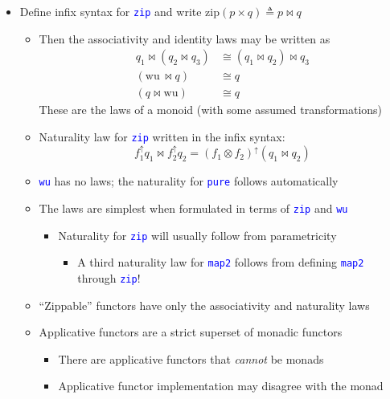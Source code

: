 \begin{itemize}
\item Define infix syntax for \texttt{\textcolor{blue}{\footnotesize{}zip}}
and write $\text{zip}\left(p\times q\right)\triangleq p\bowtie q$
\begin{itemize}
\item Then the associativity and identity laws may be written as{\footnotesize{}
\begin{align*}
q_{1}\bowtie\left(q_{2}\bowtie q_{3}\right) & \cong\left(q_{1}\bowtie q_{2}\right)\bowtie q_{3}\\
\left(\text{wu}\,\bowtie q\right) & \cong q\\
\left(q\bowtie\text{wu}\right) & \cong q
\end{align*}
}These are the laws of a monoid (with some assumed transformations)
\item Naturality law for \texttt{\textcolor{blue}{\footnotesize{}zip}} written
in the infix syntax:{\footnotesize{}
\[
f_{1}^{\uparrow}q_{1}\bowtie f_{2}^{\uparrow}q_{2}=\left(f_{1}\otimes f_{2}\right)^{\uparrow}\left(q_{1}\bowtie q_{2}\right)
\]
}{\footnotesize\par}
\item \texttt{\textcolor{blue}{\footnotesize{}wu}} has no laws; the naturality
for \texttt{\textcolor{blue}{\footnotesize{}pure}} follows automatically
\item The laws are simplest when formulated in terms of \texttt{\textcolor{blue}{\footnotesize{}zip}}
and \texttt{\textcolor{blue}{\footnotesize{}wu}} 
\begin{itemize}
\item Naturality for \texttt{\textcolor{blue}{\footnotesize{}zip}} will
usually follow from parametricity
\begin{itemize}
\item A third naturality law for \texttt{\textcolor{blue}{\footnotesize{}map2}}
follows from defining \texttt{\textcolor{blue}{\footnotesize{}map2}}
through \texttt{\textcolor{blue}{\footnotesize{}zip}}!
\end{itemize}
\end{itemize}
\item ``Zippable'' functors have only the associativity and naturality
laws
\item Applicative functors are a strict superset of monadic functors
\begin{itemize}
\item There are applicative functors that \emph{cannot} be monads
\item Applicative functor implementation may disagree with the monad
\end{itemize}
\end{itemize}
\end{itemize}


